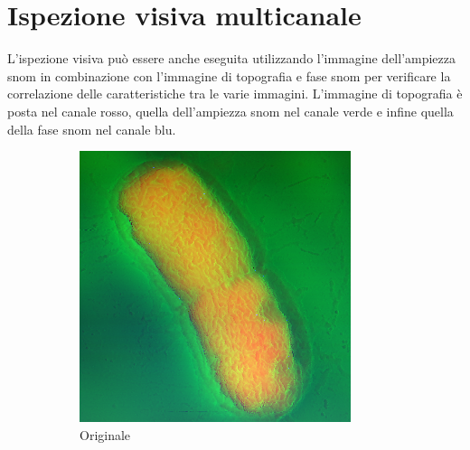 \documentclass[../main.tex]{subfiles}
\begin{document}
\section{Ispezione visiva multicanale}

L'ispezione visiva può essere anche eseguita utilizzando l'immagine dell'ampiezza \acrshort{snom} in combinazione con l'immagine di topografia e fase \acrshort{snom} per verificare la correlazione delle caratteristiche tra le varie immagini. L'immagine di topografia è posta nel canale rosso, quella dell'ampiezza \acrshort{snom} nel canale verde e infine quella della fase \acrshort{snom} nel canale blu.\\

\begin{figure}[h]
	\centering
	\begin{subfigure}{0.32\linewidth}
		\centering
		\includegraphics[keepaspectratio, width=\linewidth]{images/multi_orig.png}
		\caption{Originale}
	\end{subfigure}
	\begin{subfigure}{0.32\linewidth}
		\centering

\end{subfigure}
\end{figure}
\end{document}
